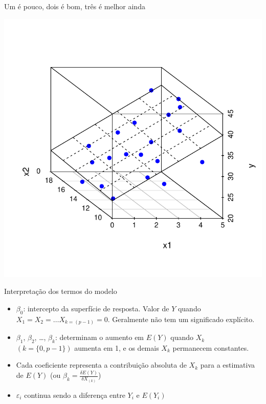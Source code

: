 \documentclass{beamer}\usepackage[]{graphicx}\usepackage[]{color}
\newenvironment{knitrout}{}{} %
\renewenvironment{knitrout}{\setlength{\topsep}{0mm}}{}
\begin{document}
\begin{frame}{Um é pouco, dois é bom, três é melhor ainda}

\begin{knitrout}
\color{fgcolor}
\includegraphics[width=0.8\linewidth]{figure/c1-1} 

\end{knitrout}

\end{frame}


\begin{frame}{Interpretação dos termos do modelo}

\begin{itemize}

\item $\beta _0$: intercepto da superfície de resposta. Valor de $Y$ quando  $X_{1} = X_2 = \dots X_{k=(p-1)} = 0$. Geralmente não tem um significado explícito. \pause
\vfill
\item $\beta _1$, $\beta _2$, \ldots, $\beta _k$: determinam o aumento em $E(Y)$ quando $X_{k}$ $(k=\{0,p-1\})$ aumenta em 1, e os demais $X_k$ permanecem constantes.\pause
\vfill
\item Cada coeficiente representa a contribuição absoluta de  $X_{k}$ para a estimativa de $E(Y)$ (ou $\beta _k = \frac{\delta E(Y)}{\delta X_{(k)}}$) \pause
\vfill
\item $\varepsilon _i$ continua sendo a diferença entre $Y_i$ e $E(Y_i)$

\end{itemize}

\end{frame}
\end{document}

